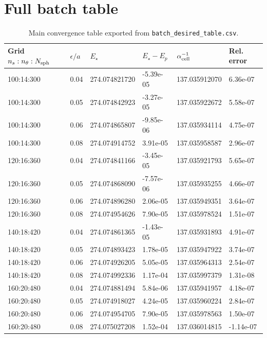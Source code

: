 \documentclass[11pt]{article}
\begin{document}
\appendix
\section{Full batch table}

\begin{table}[p]
\centering
\caption{Main convergence table exported from \texttt{batch\_desired\_table.csv}.}
\small
\begin{tabular}{@{}llllll@{}}
\toprule
Grid $n_s:n_\theta:N_{\rm sph}$ & $\epsilon/a$ & $E_\star$ & $E_\star-E_p$ & $\alpha_{\rm cell}^{-1}$ & Rel. error \\
\midrule
100:14:300 & 0.04 & 274.074821720 & -5.39e-05 & 137.035912070 & 6.36e-07 \\
100:14:300 & 0.05 & 274.074842923 & -3.27e-05 & 137.035922672 & 5.58e-07 \\
100:14:300 & 0.06 & 274.074865807 & -9.85e-06 & 137.035934114 & 4.75e-07 \\
100:14:300 & 0.08 & 274.074914752 & 3.91e-05 & 137.035958587 & 2.96e-07 \\
120:16:360 & 0.04 & 274.074841166 & -3.45e-05 & 137.035921793 & 5.65e-07 \\
120:16:360 & 0.05 & 274.074868090 & -7.57e-06 & 137.035935255 & 4.66e-07 \\
120:16:360 & 0.06 & 274.074896280 & 2.06e-05 & 137.035949351 & 3.64e-07 \\
120:16:360 & 0.08 & 274.074954626 & 7.90e-05 & 137.035978524 & 1.51e-07 \\
140:18:420 & 0.04 & 274.074861365 & -1.43e-05 & 137.035931893 & 4.91e-07 \\
140:18:420 & 0.05 & 274.074893423 & 1.78e-05 & 137.035947922 & 3.74e-07 \\
140:18:420 & 0.06 & 274.074926205 & 5.05e-05 & 137.035964313 & 2.54e-07 \\
140:18:420 & 0.08 & 274.074992336 & 1.17e-04 & 137.035997379 & 1.31e-08 \\
160:20:480 & 0.04 & 274.074881494 & 5.84e-06 & 137.035941957 & 4.18e-07 \\
160:20:480 & 0.05 & 274.074918027 & 4.24e-05 & 137.035960224 & 2.84e-07 \\
160:20:480 & 0.06 & 274.074954705 & 7.90e-05 & 137.035978563 & 1.50e-07 \\
160:20:480 & 0.08 & 274.075027208 & 1.52e-04 & 137.036014815 & -1.14e-07 \\
\bottomrule
\end{tabular}
\label{tab:fullbatch}
\end{table}
\end{document}
